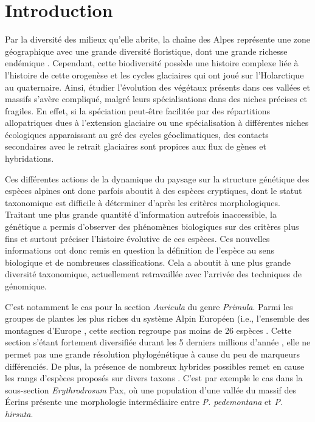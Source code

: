 \section{Introduction}

Par la diversité des milieux qu'elle abrite, la chaîne des Alpes représente une zone géographique avec une grande diversité floristique, dont une grande richesse endémique \citep{Ozenda1995}. Cependant, cette biodiversité possède une histoire complexe liée à l'histoire de cette orogenèse et les cycles glaciaires qui ont joué sur l'Holarctique au quaternaire.
 Ainsi, étudier l'évolution des végétaux présents dans ces vallées et massifs s'avère compliqué, malgré leurs spécialisations dans des niches précises et fragiles.
En effet, si la spéciation peut-être facilitée par des répartitions allopatriques dues à l’extension glaciaire ou une spécialisation à différentes niches écologiques apparaissant au gré des cycles géoclimatiques, des contacts secondaires avec le retrait glaciaires sont propices aux flux de gènes et hybridations. 

Ces différentes actions de la dynamique du paysage sur la structure génétique des espèces alpines ont donc parfois aboutit à des espèces cryptiques, dont le statut taxonomique est difficile à déterminer d'après les critères morphologiques. Traitant une plus grande quantité d'information autrefois inaccessible, la génétique a permis d'observer des phénomènes biologiques sur des critères plus fins et surtout préciser l'histoire évolutive de ces espèces. Ces nouvelles informations ont donc remis en question la définition de l'espèce au sens biologique et de nombreuses classifications. Cela a aboutit à une plus grande diversité taxonomique, actuellement retravaillée avec l'arrivée des techniques de génomique.  

C'est notamment le cas pour la section \textit{Auricula} du genre \textit{Primula}. Parmi les groupes de plantes les plus riches du système Alpin Européen (i.e., l'ensemble des montagnes d'Europe \citep{Ozenda1995} , cette section regroupe pas moins de 26 espèces \citep{Zhang2004}. Cette section s'étant fortement diversifiée durant les 5 derniers millions d'année \citep{Zhang2004a}
, elle ne permet pas une grande résolution phylogénétique à cause du peu de marqueurs différenciés. De plus, la présence de nombreux hybrides possibles remet en cause les rangs d'espèces proposés sur divers taxons \citep{Kadereit2011}. C'est par exemple le cas dans la sous-section \textit{Erythrodrosum} Pax, où une population d'une vallée du massif des Écrins présente une morphologie intermédiaire entre \textit{P. pedemontana} et \textit{P. hirsuta}. 

